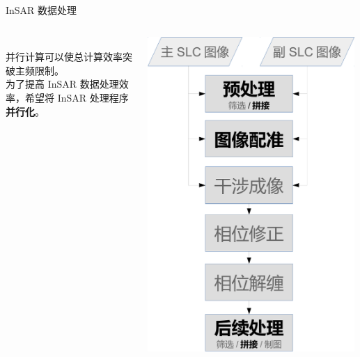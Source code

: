 \documentclass{beamer}
\begin{document}
\begin{frame}{InSAR 数据处理}
\begin{columns}
\begin{column}{0.6\textwidth}
\begin{scriptsize}
            ~\\
            并行计算可以使总计算效率突破主频限制。\\
            为了提高 InSAR 数据处理效率，希望将 InSAR 处理程序\textbf{并行化}。
            \end{scriptsize}
        \end{column}
        \begin{column}{0.4\textwidth}
            \includegraphics[width=0.99\textwidth]{figures/process.pdf}
        \end{column}
    \end{columns}
\end{frame}
\end{document}
